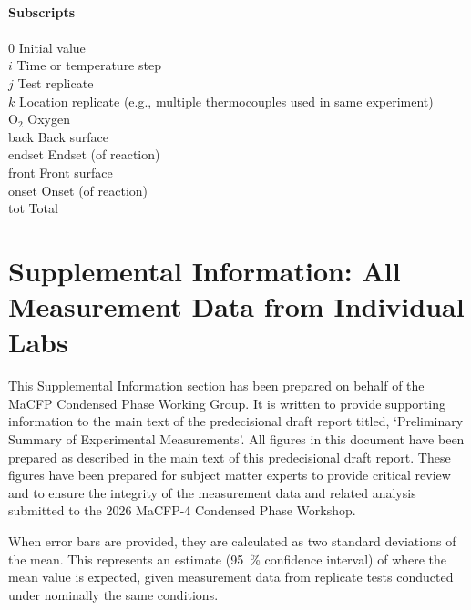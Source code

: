 \begin{tabbing}
	\hspace{0.1in}            	\> \\
	{\bf Subscripts}      	    \> \\
	\hspace{0.1in}            	\> \\
	0     	                    \> Initial value \\
	$i$                         \> Time or temperature step\\
	$j$                         \> Test replicate\\
	$k$	                        \> Location replicate (e.g., multiple thermocouples used in same experiment)\\
	O$_2$                       \> Oxygen \\
	back         				\> Back surface\\
	endset         				\> Endset (of reaction)\\
	front         				\> Front surface\\
	onset                  		\> Onset (of reaction)\\
	tot                  		\> Total\\

	
\end{tabbing}




\chapter{Supplemental Information: All Measurement Data from Individual Labs}
\label{SI}
This Supplemental Information section has been prepared on behalf of the MaCFP Condensed Phase Working Group. It is written to provide supporting information to the main text of the predecisional draft report titled, `Preliminary Summary of Experimental Measurements'. All figures in this document have been prepared as described in the main text of this predecisional draft report. These figures have been prepared for subject matter experts to provide critical review and to ensure the integrity of the measurement data and related analysis submitted to the 2026 MaCFP-4 Condensed Phase Workshop.

When error bars are provided, they are calculated as two standard deviations of the mean. This represents an estimate (95~\% confidence interval) of where the mean value is expected, given measurement data from replicate tests conducted under nominally the same conditions.

\newpage
